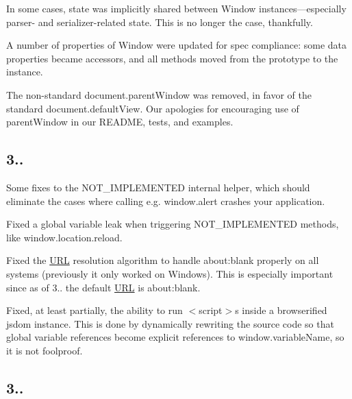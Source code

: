 \begin{DoxyItemize}
\item In some cases, state was implicitly shared between {\ttfamily Window} instances—especially parser-\/ and serializer-\/related state. This is no longer the case, thankfully.
\item A number of properties of {\ttfamily Window} were updated for spec compliance\+: some data properties became accessors, and all methods moved from the prototype to the instance.
\item The non-\/standard {\ttfamily document.\+parent\+Window} was removed, in favor of the standard {\ttfamily document.\+default\+View}. Our apologies for encouraging use of {\ttfamily parent\+Window} in our R\+E\+A\+D\+ME, tests, and examples.
\end{DoxyItemize}

\subsection*{3..}


\begin{DoxyItemize}
\item Some fixes to the {\ttfamily N\+O\+T\+\_\+\+I\+M\+P\+L\+E\+M\+E\+N\+T\+ED} internal helper, which should eliminate the cases where calling e.\+g. {\ttfamily window.\+alert} crashes your application.
\item Fixed a global variable leak when triggering {\ttfamily N\+O\+T\+\_\+\+I\+M\+P\+L\+E\+M\+E\+N\+T\+ED} methods, like {\ttfamily window.\+location.\+reload}.
\item Fixed the \mbox{\hyperlink{namespace_u_r_l}{U\+RL}} resolution algorithm to handle {\ttfamily about\+:blank} properly on all systems (previously it only worked on Windows). This is especially important since as of 3.. the default \mbox{\hyperlink{namespace_u_r_l}{U\+RL}} is {\ttfamily about\+:blank}.
\item Fixed, at least partially, the ability to run {\ttfamily $<$script$>$}s inside a browserified jsdom instance. This is done by dynamically rewriting the source code so that global variable references become explicit references to {\ttfamily window.\+variable\+Name}, so it is not foolproof.
\end{DoxyItemize}

\subsection*{3..}


